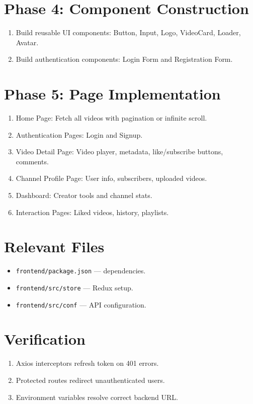 \documentclass[a4paper,12pt]{article}
\begin{document}
\section*{Phase 4: Component Construction}
\begin{enumerate}[label=\arabic*.]
\item Build reusable UI components: Button, Input, Logo, VideoCard, Loader, Avatar.
\item Build authentication components: Login Form and Registration Form.
\end{enumerate}

\section*{Phase 5: Page Implementation}
\begin{enumerate}[label=\arabic*.]
\item Home Page: Fetch all videos with pagination or infinite scroll.
\item Authentication Pages: Login and Signup.
\item Video Detail Page: Video player, metadata, like/subscribe buttons, comments.
\item Channel Profile Page: User info, subscribers, uploaded videos.
\item Dashboard: Creator tools and channel stats.
\item Interaction Pages: Liked videos, history, playlists.
\end{enumerate}

\section*{Relevant Files}
\begin{itemize}
\item \texttt{frontend/package.json} — dependencies.
\item \texttt{frontend/src/store} — Redux setup.
\item \texttt{frontend/src/conf} — API configuration.
\end{itemize}

\section*{Verification}
\begin{enumerate}
\item Axios interceptors refresh token on 401 errors.
\item Protected routes redirect unauthenticated users.
\item Environment variables resolve correct backend URL.
\end{enumerate}
\end{document}
